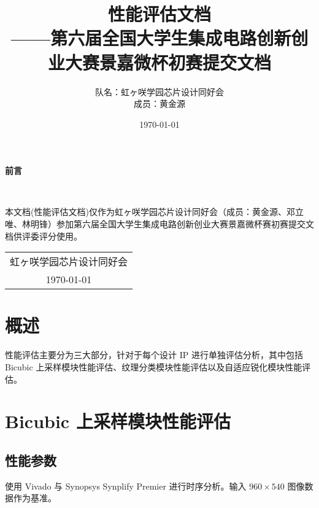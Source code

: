 \documentclass[12pt, a4paper, oneside]{ctexbook}
\title{{\Huge{\textbf{性能评估文档}}}\normalsize{\\——第六届全国大学生集成电路创新创业大赛景嘉微杯初赛提交文档}}
\author{队名：虹ヶ咲学园芯片设计同好会\\ 成员：黄金源\space邓立唯\space林明锋}
\date{\today}
\begin{document}
	
	\maketitle	
	\setcounter{page}{1}
	\begin{center}
		\Huge\textbf{前言}
	\end{center}~\
	
	本文档(性能评估文档)仅作为虹ヶ咲学园芯片设计同好会（成员：黄金源、邓立唯、林明锋）参加第六届全国大学生集成电路创新创业大赛景嘉微杯赛初赛提交文档供评委评分使用。
	~\\
	\begin{flushright}
		\begin{tabular}{c}
			虹ヶ咲学园芯片设计同好会\\
			\today
		\end{tabular}
	\end{flushright}
	\newpage
	\setcounter{page}{1}
	\tableofcontents
	\newpage
	\setcounter{page}{1}
	
	\chapter{概述}
	性能评估主要分为三大部分，针对于每个设计 IP 进行单独评估分析，其中包括 Bicubic 上采样模块性能评估、纹理分类模块性能评估以及自适应锐化模块性能评估。
	
	\chapter{Bicubic 上采样模块性能评估}
	\section{性能参数}
	使用 Vivado 与 Synopsys Synplify Premier 进行时序分析。输入 $960\times540$ 图像数据作为基准。
\end{document}
